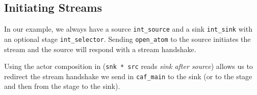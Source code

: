 \clearpage

\subsection{Initiating Streams}


In our example, we always have a source \lstinline^int_source^ and a sink
\lstinline^int_sink^ with an optional stage \lstinline^int_selector^. Sending
\lstinline^open_atom^ to the source initiates the stream and the source will
respond with a stream handshake.

Using the actor composition in \lib (\lstinline^snk * src^ reads \emph{sink
after source}) allows us to redirect the stream handshake we send in
\lstinline^caf_main^ to the sink (or to the stage and then from the stage to
the sink).
